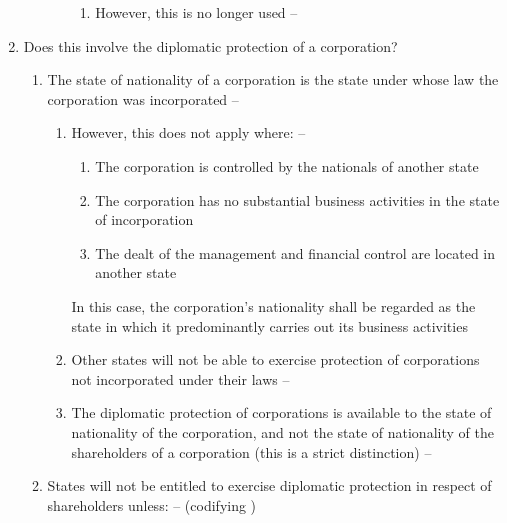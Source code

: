 \begin{enumerate}
\begin{enumerate}
\begin{enumerate}
            \begin{enumerate}
                \item However, this is no longer used -- 
            \end{enumerate}
        \end{enumerate}
    \end{enumerate}
    \item Does this involve the diplomatic protection of a corporation?
    \begin{enumerate}
        \item The state of nationality of a corporation is the state under whose law the corporation was incorporated -- 
        \begin{enumerate}
            \item However, this does not apply where: -- 
            \begin{enumerate}
                \item The corporation is controlled by the nationals of another state
                \item The corporation has no substantial business activities in the state of incorporation
                \item The dealt of the management and financial control are located in another state
            \end{enumerate}
            In this case, the corporation's nationality shall be regarded as the state in which it predominantly carries out its business activities
            \item Other states will not be able to exercise protection of corporations not incorporated under their laws -- 
            \item The diplomatic protection of corporations is available to the state of nationality of the corporation, and not the state of nationality of the shareholders of a corporation (this is a strict distinction) -- 
        \end{enumerate}
        \item States will not be entitled to exercise diplomatic protection in respect of shareholders unless: --  (codifying )

\end{enumerate}
\end{enumerate}
